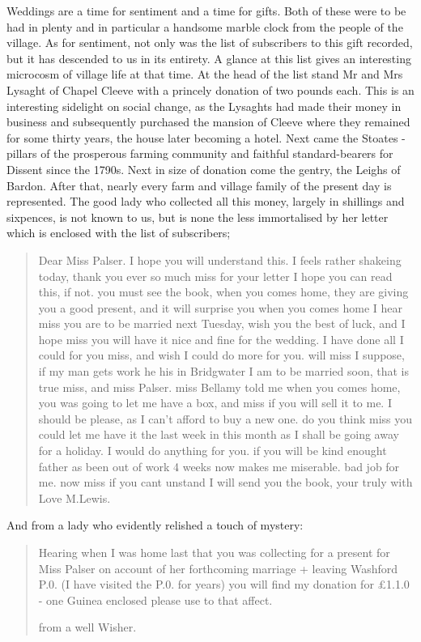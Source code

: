 Weddings are a time for sentiment and a time for gifts. Both of these were to be had in plenty and in particular a handsome marble clock from the people of the village. As for sentiment, not only was the list of subscribers to this gift recorded, but it has descended to us in its entirety. A glance at this list gives an interesting microcosm of village life at that time. At the head of the list stand Mr and Mrs Lysaght of Chapel Cleeve with a princely donation of two pounds each. This is an interesting sidelight on social change, as the Lysaghts had made their money in business and subsequently purchased the mansion of Cleeve where they remained for some thirty years, the house later becoming a hotel. Next came the Stoates - pillars of the prosperous farming community and faithful standard-bearers for Dissent since the 1790s. Next in size of donation come the gentry, the Leighs of Bardon. After that, nearly every farm and village family of the present day is represented. The good lady who collected all this money, largely in shillings and sixpences, is not known to us, but is none the less immortalised by her letter which is enclosed with the list of subscribers;

\begin{quote}
Dear Miss Palser. I hope you will understand this. I feels rather shakeing today, thank you ever so much miss for your letter I hope you can read this, if not. you must see the book, when you comes home, they are giving you a good present, and it will surprise you when you comes home I hear miss you are to be married next Tuesday, wish you the best of luck, and I hope miss you will have it nice and fine for the wedding. I have done all I could for you miss, and wish I could do more for you. will miss I suppose, if my man gets work he his in Bridgwater I am to be married soon, that is true miss, and miss Palser. miss Bellamy told me when you comes home, you was going to let me have a box, and miss if you will sell it to me. I should be please, as I can't afford to buy a new one. do you think miss you could let me have it the last week in this month as I shall be going away for a holiday. I would do anything for you. if you will be kind enought father as been out of work 4 weeks now makes me miserable. bad job for me. now miss if you cant unstand I will send you the book, your truly with Love M.Lewis.
\end{quote}

And from a lady who evidently relished a touch of mystery:


\begin{quote}
Hearing when I was home last that you was collecting for a present for Miss Palser on account of her forthcoming marriage + leaving Washford P.0. (I have visited the P.0. for years) you will find my donation for £1.1.0 - one Guinea enclosed please use to that affect.

from a well Wisher.
\end{quote}

